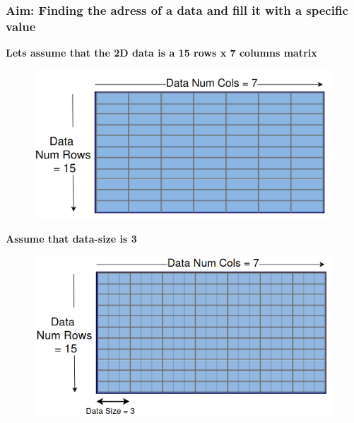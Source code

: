 \documentclass[9pt]{beamer}
\begin{document}
\begin{frame}[fragile]
\frametitle{Aim: Finding the adress of a data and fill it with a specific value}
\hspace{-0.4\baselineskip}
\textbf{Lets assume that the 2D data is a 15 rows x 7 columns matrix}
\newline

\begin{figure}
\hspace{-1.2\baselineskip}
   \centering
   \includegraphics[width=0.45\linewidth]{Screenshot from 2024-10-21 01-01-17.png}
   \label{fig:enter-label}
\end{figure}
\hspace{0.1\baselineskip}
\small
\textbf{Assume that data-size is 3}
\begin{figure}
\hspace{-1.2\baselineskip}
   \centering
   \includegraphics[width=0.45\linewidth]{Screenshot from 2024-10-21 00-56-34.png}
   \label{fig:enter-label}
\end{figure}

\end{frame}
\end{document}
